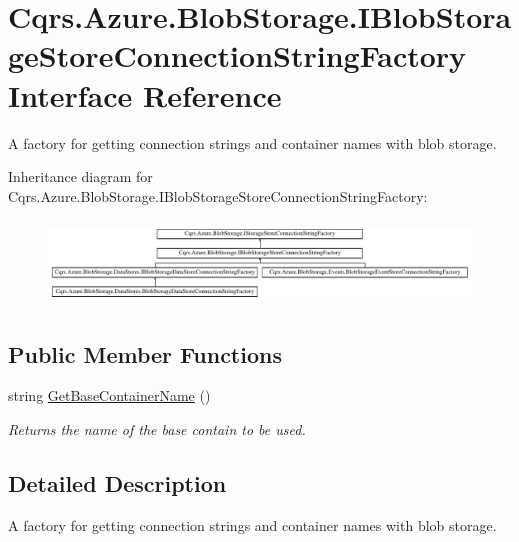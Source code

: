 \hypertarget{interfaceCqrs_1_1Azure_1_1BlobStorage_1_1IBlobStorageStoreConnectionStringFactory}{}\section{Cqrs.\+Azure.\+Blob\+Storage.\+I\+Blob\+Storage\+Store\+Connection\+String\+Factory Interface Reference}
\label{interfaceCqrs_1_1Azure_1_1BlobStorage_1_1IBlobStorageStoreConnectionStringFactory}


A factory for getting connection strings and container names with blob storage.  


Inheritance diagram for Cqrs.\+Azure.\+Blob\+Storage.\+I\+Blob\+Storage\+Store\+Connection\+String\+Factory\+:\begin{figure}[H]
\begin{center}
\leavevmode
\includegraphics[height=2.258065cm]{interfaceCqrs_1_1Azure_1_1BlobStorage_1_1IBlobStorageStoreConnectionStringFactory}
\end{center}
\end{figure}
\subsection*{Public Member Functions}
\begin{DoxyCompactItemize}
\item 
string \hyperlink{interfaceCqrs_1_1Azure_1_1BlobStorage_1_1IBlobStorageStoreConnectionStringFactory_a57145e68e3bda84bc610fa61226a850c_a57145e68e3bda84bc610fa61226a850c}{Get\+Base\+Container\+Name} ()
\begin{DoxyCompactList}\small\item\em Returns the name of the base contain to be used. \end{DoxyCompactList}\end{DoxyCompactItemize}


\subsection{Detailed Description}
A factory for getting connection strings and container names with blob storage. 



